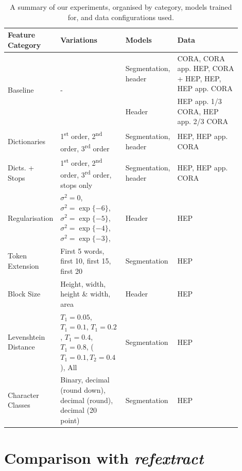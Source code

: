 \begin{table}[h]
\begin{center}
\begin{tabular}{ | p{0.2\linewidth} | p{0.25\linewidth} | p{0.15\linewidth} | p{0.3\linewidth} |}
\hline
Feature Category & Variations & Models & Data\\
\hline
\multirow{2}{*}{Baseline} & \multirow{2}{*}{-} & Segmentation, header & CORA, CORA app. HEP, CORA + HEP, HEP, HEP app. CORA \\
\cline{3-4}
 & & Header & HEP app. 1/3 CORA, HEP app. 2/3 CORA \\
\hline
Dictionaries & 1\textsuperscript{st} order, 2\textsuperscript{nd} order, 3\textsuperscript{rd} order & Segmentation, header & HEP, HEP app. CORA \\
\hline
Dicts. + Stops & 1\textsuperscript{st} order, 2\textsuperscript{nd} order, 3\textsuperscript{rd} order, stops only & Segmentation, header & HEP, HEP app. CORA \\
\hline
Regularisation & $\sigma^2=0$, $\sigma^2=\exp\{-6\}$, $\sigma^2=\exp\{-5\}$, $\sigma^2=\exp\{-4\}$, $\sigma^2=\exp\{-3\}$, & Header & HEP \\
\hline
Token Extension & First 5 words, first 10, first 15, first 20 & Segmentation & HEP \\
\hline
Block Size & Height, width, height \& width, area & Header & HEP \\
\hline
Levenshtein Distance & $T_1 = 0.05$, $T_1 = 0.1$, $T_1 = 0.2$, $T_1 = 0.4$, $T_1 = 0.8$, ($T_1 = 0.1, T_2 = 0.4$), All & Segmentation & HEP \\
\hline
Character Classes & Binary, decimal (round down), decimal (round), decimal (20 point) & Segmentation & HEP \\
\hline
\end{tabular}
\caption[A summary of our experiments, organised by category, models trained for, and data configurations used.]{A summary of our experiments, organised by category, models trained for, and data configurations used.}
\label{table:experiments}
\end{center}
\end{table}

\section{Comparison with \emph{refextract}}
\label{sec:refextract}

